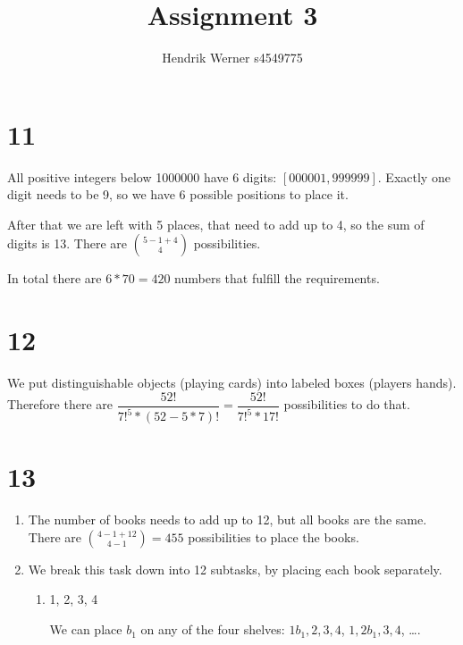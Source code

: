 \documentclass[12pt]{article}
\title{Assignment 3}
\author{
	Hendrik Werner s4549775
}
\begin{document}
\maketitle

\section*{11}
All positive integers below 1000000 have 6 digits: $[000001, 999999]$. Exactly one digit needs to be 9, so we have 6 possible positions to place it.

After that we are left with 5 places, that need to add up to 4, so the sum of digits is 13. There are $\binom{5 - 1 + 4}{4}$ possibilities.

In total there are $6 * 70 = 420$ numbers that fulfill the requirements.

\section*{12}
We put distinguishable objects (playing cards) into labeled boxes (players hands). Therefore there are $\dfrac{52!}{7!^5 * (52 - 5 * 7)!} =  \dfrac{52!}{7!^5 * 17!}$ possibilities to do that.

\section*{13}
\begin{enumerate}[a]
	\item %
	The number of books needs to add up to 12, but all books are the same. There are $\binom{4 - 1 + 12}{4 - 1} = 455$ possibilities to place the books.

	\item %
	We break this task down into 12 subtasks, by placing each book separately.

	\begin{enumerate}
		\item 1, 2, 3, 4

		We can place $b_1$ on any of the four shelves: $1 b_1, 2, 3, 4$, $1, 2 b_1, 3, 4$, \dots.
	\end{enumerate}
\end{enumerate}
\end{document}
